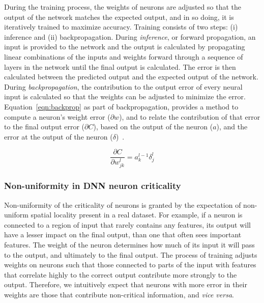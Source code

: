 During the training process, the weights of neurons are adjusted so that the output of the network matches the expected output, and in so doing, it is iteratively trained to maximize accuracy.
Training consists of two steps: (i) inference and (ii) backpropagation.
During \textit{inference}, or forward propagation, an input is provided to the network and the output is calculated by propagating linear combinations of the inputs and weights forward through a sequence of layers in the network until the final output is calculated.
The error is then calculated between the predicted output and the expected output of the network.
During \textit{backpropagation}, the contribution to the output error of every neural input is calculated so that the weights can be adjusted to minimize the error.
Equation~\ref{eqn:backprop} as part of backpropagation, provides a method to compute a neuron's weight error ($\partial w$), and to relate the contribution of that error to the final output error ($\partial C$), based on the output of the neuron ($a$), and the error at the output of the neuron ($\delta$)~\cite{nielsen2015neural}.

\begin{equation}
\frac{\partial C}{\partial w_{jk}^{l}}=a_{k}^{l-1}\delta_{j}^{l}
\label{eqn:backprop}
\end{equation}

\subsubsection{Non-uniformity in DNN neuron criticality}

Non-uniformity of the criticality of neurons is granted by the expectation of non-uniform spatial locality present in a real dataset.
For example, if a neuron is connected to a region of input that rarely contains any features, its output will have a lesser impact on the final output, than one that often sees important features.
The weight of the neuron determines how much of its input it will pass to the output, and ultimately to the final output.
The process of training adjusts weights on neurons such that those connected to parts of the input with features that correlate highly to the correct output contribute more strongly to the output.
Therefore, we intuitively expect that neurons with more error in their weights are those that contribute non-critical information, and \textit{vice versa}.


